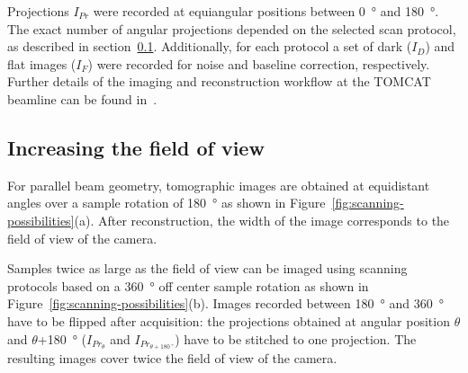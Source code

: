 Projections $I_{Pr}$ were recorded at equiangular positions between \SI{0}{\degree} and \SI{180}{\degree}. The exact number of angular projections depended on the selected scan protocol, as described in section~\ref{subsec:increasing the field of view}. Additionally, for each protocol a set of dark ($I_{D}$) and flat images ($I_{F}$) were recorded for noise and baseline correction, respectively. Further details of the imaging and reconstruction workflow at the TOMCAT beamline can be found in~\cite{Hintermueller2010}.

\subsection{Increasing the field of view}\label{subsec:increasing the field of view}
For parallel beam geometry, tomographic images are obtained at equidistant angles over a sample rotation of \SI{180}{\degree} as shown in Figure~\ref{fig:scanning-possibilities}(a). After reconstruction, the width of the image corresponds to the field of view of the camera.

Samples twice as large as the field of view can be imaged using scanning protocols based on a \SI{360}{\degree} off center sample rotation as shown in Figure~\ref{fig:scanning-possibilities}(b). Images recorded between \SI{180}{\degree} and \SI{360}{\degree} have to be flipped after acquisition: the projections obtained at angular position $\theta$ and $\theta$+\SI{180}{\degree} ($I_{Pr_{\theta}}$ and $I_{Pr_{\theta+\SI{180}{\degree}}}$) have to be stitched to one projection. The resulting images cover twice the field of view of the camera.

